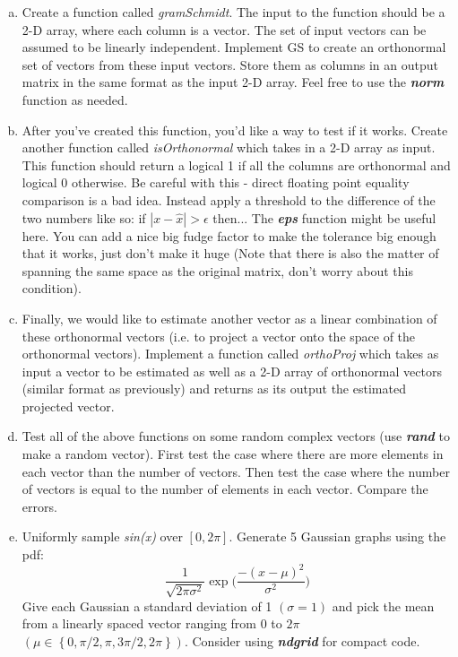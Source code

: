 \documentclass[11pt]{article}
\begin{document}
\begin{enumerate}[a.]
    \item Create a function called \emph{gramSchmidt}.  
    The input to the function should be a 2-D array, 
    where each column is a vector.
    The set of input vectors can be assumed to be linearly independent. 
    Implement GS to create an orthonormal set of vectors from these input vectors.
    Store them as columns in an output matrix in the same format as the input 2-D array.
    Feel free to use the \textbf{\textit{norm}} function as needed.

    \item After you've created this function, you'd like a way to test if it works.
    Create another function called \emph{isOrthonormal} which takes in a 2-D array as input.
    This function should return a logical 1 if all the columns are orthonormal and logical 0 otherwise.
    Be careful with this - direct floating point equality comparison is a bad idea.
    Instead apply a threshold to the difference of the two numbers like so:
    if $|x-\hat{x}| > \epsilon$ then... The \textbf{\textit{eps}} function might be useful here.
    You can add a nice big fudge factor to make the tolerance big enough that it works,
    just don't make it huge
    (Note that there is also the matter of spanning the same space as the original matrix,
    don't worry about this condition).

    \item Finally, we would like to estimate another vector as a linear combination of
    these orthonormal vectors (i.e. to project a vector onto the space of the orthonormal vectors).
    Implement a function called \emph{orthoProj} which takes as input a vector to be estimated 
    as well as a 2-D array of orthonormal vectors (similar format as previously) and returns
    as its output the estimated projected vector.

    \item Test all of the above functions on some random complex vectors (use \textit{\textbf{rand}} to
    make a random vector).
    First test the case where there are more elements in each vector than the number of vectors.
    Then test the case where the number of vectors is equal to the number of elements in each vector.
    Compare the errors.

    \item Uniformly sample \emph{sin(x)} over $[0, 2\pi]$. Generate 5 Gaussian graphs using the pdf:
    $$
    \frac{1}{\sqrt{2\pi \sigma^2}}\exp{\bigg(\frac{-(x-\mu)^2}{\sigma^2}\bigg)}
    $$
    Give each Gaussian a standard deviation of 1 $(\sigma = 1)$ and pick the mean from a linearly
    spaced vector ranging from $0$ to $2\pi$ $(\mu \in \left\{0, \pi/2, \pi, 3\pi/2, 2\pi\right\})$.
    Consider using \textit{\textbf{ndgrid}} for compact code. 
    \begin{enumerate}


\end{enumerate}
\end{enumerate}
\end{document}
